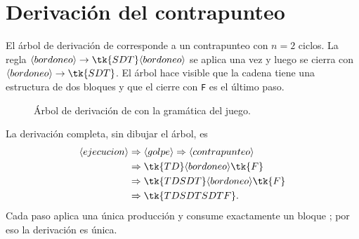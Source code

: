 %
%
%     
%

\section{Derivación del contrapunteo}
\label{app:derivacion}

El árbol de derivación de  corresponde a un contrapunteo con $n=2$ ciclos. La regla $\langle bordoneo\rangle\to\tk{SDT}\langle bordoneo\rangle$ se aplica una vez y luego se cierra con $\langle bordoneo\rangle\to\tk{SDT}$. El árbol hace visible que la cadena tiene una estructura de dos bloques y que el cierre con \texttt{F} es el último paso.

\begin{figure}[t]
\centering
{}
\caption{Árbol de derivación de  con la gramática del juego.}
\label{fig:derivacion}
\end{figure}

La derivación completa, sin dibujar el árbol, es
\begin{align}
  \langle ejecucion\rangle
  &\Rightarrow \langle golpe\rangle
  \Rightarrow \langle contrapunteo\rangle \notag\\
  &\Rightarrow \tk{TD}\langle bordoneo\rangle\tk{F} \notag\\
  &\Rightarrow \tk{TDSDT}\langle bordoneo\rangle\tk{F} \notag\\
  &\Rightarrow \tk{TDSDTSDTF}.
  \label{eq:derivacion}
\end{align}
Cada paso aplica una única producción y consume exactamente un bloque ; por eso la derivación es única.

